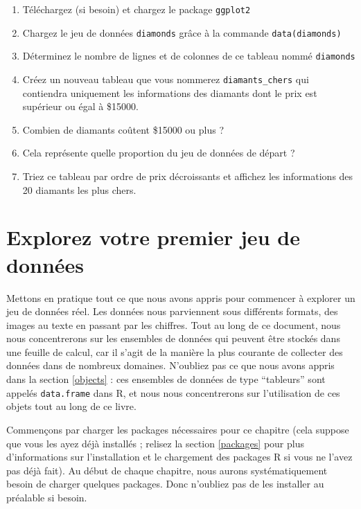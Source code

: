 \documentclass[a4paperpaper,]{article}
\providecommand{\tightlist}{%
  \setlength{\itemsep}{0pt}\setlength{\parskip}{0pt}}
\begin{document}
\begin{enumerate}
\def\labelenumi{\arabic{enumi}.}
\tightlist
\item
  Téléchargez (si besoin) et chargez le package \texttt{ggplot2}
\item
  Chargez le jeu de données \texttt{diamonds} grâce à la commande \texttt{data(diamonds)}
\item
  Déterminez le nombre de lignes et de colonnes de ce tableau nommé \texttt{diamonds}
\item
  Créez un nouveau tableau que vous nommerez \texttt{diamants\_chers} qui contiendra uniquement les informations des diamants dont le prix est supérieur ou égal à \$15000.
\item
  Combien de diamants coûtent \$15000 ou plus ?
\item
  Cela représente quelle proportion du jeu de données de départ ?
\item
  Triez ce tableau par ordre de prix décroissants et affichez les informations des 20 diamants les plus chers.
\end{enumerate}

\hypertarget{dataset}{%
\section{Explorez votre premier jeu de données}\label{dataset}}

Mettons en pratique tout ce que nous avons appris pour commencer à explorer un jeu de données réel. Les données nous parviennent sous différents formats, des images au texte en passant par les chiffres. Tout au long de ce document, nous nous concentrerons sur les ensembles de données qui peuvent être stockés dans une feuille de calcul, car il s'agit de la manière la plus courante de collecter des données dans de nombreux domaines. N'oubliez pas ce que nous avons appris dans la section \ref{objects} : ces ensembles de données de type ``tableurs'' sont appelés \texttt{data.frame} dans R, et nous nous concentrerons sur l'utilisation de ces objets tout au long de ce livre.

Commençons par charger les packages nécessaires pour ce chapitre (cela suppose que vous les ayez déjà installés ; relisez la section \ref{packages} pour plus d'informations sur l'installation et le chargement des packages R si vous ne l'avez pas déjà fait). Au début de chaque chapitre, nous aurons systématiquement besoin de charger quelques packages. Donc n'oubliez pas de les installer au préalable si besoin.
\end{document}
